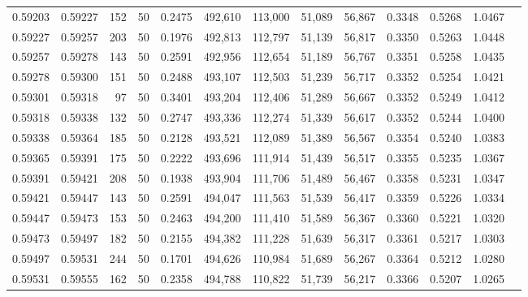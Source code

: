 \begin{tabular}{rrrrrrrrrrrrr}
0.59203 & 0.59227 &   152 &  50 &                                     0.2475 & 492,610 & 113,000 &  51,089 &  56,867 & 0.3348 & 0.5268 & 1.0467 \\
0.59227 & 0.59257 &   203 &  50 &                                     0.1976 & 492,813 & 112,797 &  51,139 &  56,817 & 0.3350 & 0.5263 & 1.0448 \\
0.59257 & 0.59278 &   143 &  50 &                                     0.2591 & 492,956 & 112,654 &  51,189 &  56,767 & 0.3351 & 0.5258 & 1.0435 \\
0.59278 & 0.59300 &   151 &  50 &                                     0.2488 & 493,107 & 112,503 &  51,239 &  56,717 & 0.3352 & 0.5254 & 1.0421 \\
0.59301 & 0.59318 &    97 &  50 &                                     0.3401 & 493,204 & 112,406 &  51,289 &  56,667 & 0.3352 & 0.5249 & 1.0412 \\
0.59318 & 0.59338 &   132 &  50 &                                     0.2747 & 493,336 & 112,274 &  51,339 &  56,617 & 0.3352 & 0.5244 & 1.0400 \\
0.59338 & 0.59364 &   185 &  50 &                                     0.2128 & 493,521 & 112,089 &  51,389 &  56,567 & 0.3354 & 0.5240 & 1.0383 \\
0.59365 & 0.59391 &   175 &  50 &                                     0.2222 & 493,696 & 111,914 &  51,439 &  56,517 & 0.3355 & 0.5235 & 1.0367 \\
0.59391 & 0.59421 &   208 &  50 &                                     0.1938 & 493,904 & 111,706 &  51,489 &  56,467 & 0.3358 & 0.5231 & 1.0347 \\
0.59421 & 0.59447 &   143 &  50 &                                     0.2591 & 494,047 & 111,563 &  51,539 &  56,417 & 0.3359 & 0.5226 & 1.0334 \\
0.59447 & 0.59473 &   153 &  50 &                                     0.2463 & 494,200 & 111,410 &  51,589 &  56,367 & 0.3360 & 0.5221 & 1.0320 \\
0.59473 & 0.59497 &   182 &  50 &                                     0.2155 & 494,382 & 111,228 &  51,639 &  56,317 & 0.3361 & 0.5217 & 1.0303 \\
0.59497 & 0.59531 &   244 &  50 &                                     0.1701 & 494,626 & 110,984 &  51,689 &  56,267 & 0.3364 & 0.5212 & 1.0280 \\
0.59531 & 0.59555 &   162 &  50 &                                     0.2358 & 494,788 & 110,822 &  51,739 &  56,217 & 0.3366 & 0.5207 & 1.0265 \\

\end{tabular}
